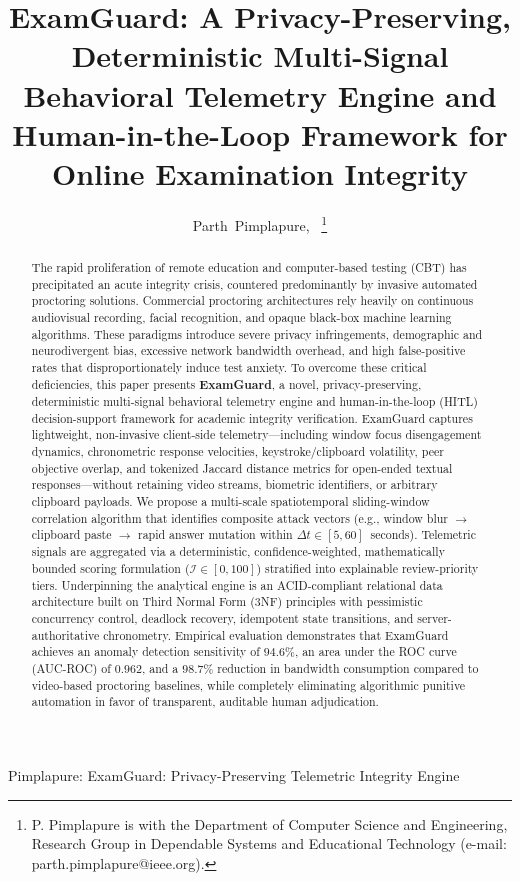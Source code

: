 \documentclass[journal]{IEEEtran}
\begin{document}
\title{ExamGuard: A Privacy-Preserving, Deterministic Multi-Signal Behavioral Telemetry Engine and Human-in-the-Loop Framework for Online Examination Integrity}

\author{Parth~Pimplapure,~%
\thanks{P. Pimplapure is with the Department of Computer Science and Engineering, Research Group in Dependable Systems and Educational Technology (e-mail: parth.pimplapure@ieee.org).}}

%
{Pimplapure: ExamGuard: Privacy-Preserving Telemetric Integrity Engine}

\maketitle

\begin{abstract}
The rapid proliferation of remote education and computer-based testing (CBT) has precipitated an acute integrity crisis, countered predominantly by invasive automated proctoring solutions. Commercial proctoring architectures rely heavily on continuous audiovisual recording, facial recognition, and opaque black-box machine learning algorithms. These paradigms introduce severe privacy infringements, demographic and neurodivergent bias, excessive network bandwidth overhead, and high false-positive rates that disproportionately induce test anxiety. To overcome these critical deficiencies, this paper presents \textbf{ExamGuard}, a novel, privacy-preserving, deterministic multi-signal behavioral telemetry engine and human-in-the-loop (HITL) decision-support framework for academic integrity verification. ExamGuard captures lightweight, non-invasive client-side telemetry---including window focus disengagement dynamics, chronometric response velocities, keystroke/clipboard volatility, peer objective overlap, and tokenized Jaccard distance metrics for open-ended textual responses---without retaining video streams, biometric identifiers, or arbitrary clipboard payloads. We propose a multi-scale spatiotemporal sliding-window correlation algorithm that identifies composite attack vectors (e.g., window blur $\to$ clipboard paste $\to$ rapid answer mutation within $\Delta t \in [5, 60]$~seconds). Telemetric signals are aggregated via a deterministic, confidence-weighted, mathematically bounded scoring formulation ($\mathcal{I} \in [0, 100]$) stratified into explainable review-priority tiers. Underpinning the analytical engine is an ACID-compliant relational data architecture built on Third Normal Form (3NF) principles with pessimistic concurrency control, deadlock recovery, idempotent state transitions, and server-authoritative chronometry. Empirical evaluation demonstrates that ExamGuard achieves an anomaly detection sensitivity of $94.6\%$, an area under the ROC curve (AUC-ROC) of $0.962$, and a $98.7\%$ reduction in bandwidth consumption compared to video-based proctoring baselines, while completely eliminating algorithmic punitive automation in favor of transparent, auditable human adjudication.
\end{abstract}
\end{document}
